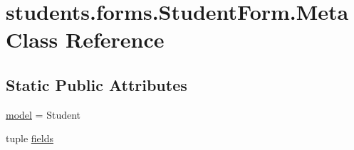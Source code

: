 \hypertarget{classstudents_1_1forms_1_1_student_form_1_1_meta}{\section{students.\-forms.\-Student\-Form.\-Meta Class Reference}
\label{classstudents_1_1forms_1_1_student_form_1_1_meta}
}
\subsection*{Static Public Attributes}
\begin{DoxyCompactItemize}
\item 
\hyperlink{classstudents_1_1forms_1_1_student_form_1_1_meta_a944b39a53a9423f8b62a08077e07db83}{model} = Student
\item 
tuple \hyperlink{classstudents_1_1forms_1_1_student_form_1_1_meta_ad8329dc8092a0ae452e6519cb0c8a520}{fields}
\end{DoxyCompactItemize}


